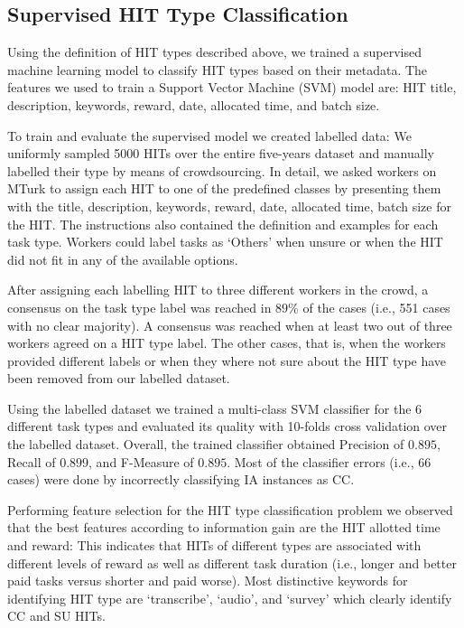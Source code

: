 \subsection{Supervised HIT Type Classification}
Using the definition of HIT types described above, we trained a supervised machine learning model to classify HIT types based on their metadata. The features we used to train a Support Vector Machine (SVM) model are: HIT title, description, keywords, reward, date, allocated time, and batch size.

To train and evaluate the supervised model we created labelled data: We uniformly sampled 5000 HITs over the entire five-years dataset and manually labelled their type by means of crowdsourcing. In detail, we asked workers on MTurk to assign each HIT to one of the predefined classes by presenting them with the title, description, keywords, reward, date, allocated time, batch size for the HIT. The instructions also contained the definition and examples for each task type. Workers could label tasks as `Others' when unsure or when the HIT did not fit in any of the available options.

After assigning each labelling HIT to three different workers in the crowd, a consensus on the task type label was reached in $89\%$ of the cases (i.e., 551 cases with no clear majority). A consensus was reached when at least two out of three workers agreed on a HIT type label. The other cases, that is, when the workers provided different labels or when they where not sure about the HIT type have been removed from our labelled dataset.

Using the labelled dataset we trained a multi-class SVM classifier for the 6 different task types and evaluated its quality with 10-folds cross validation over the labelled dataset. Overall, the trained classifier obtained Precision of $0.895$, Recall of $0.899$, and F-Measure of $0.895$. Most of the classifier errors (i.e., 66 cases) were done by incorrectly classifying IA instances as CC.

Performing feature selection for the HIT type classification problem we observed that the best features according to information gain are the HIT allotted time and reward: This indicates that HITs of different types are associated with different levels of reward as well as different task duration (i.e., longer and better paid tasks versus shorter and paid worse). 
Most distinctive keywords for identifying HIT type are `transcribe', `audio', and `survey' which clearly identify CC and SU HITs.
 
